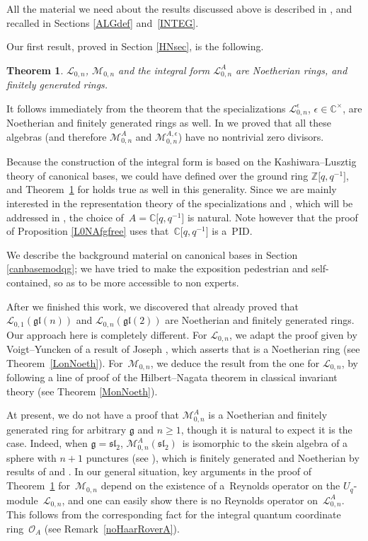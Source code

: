 \documentclass[10pt,a4paper]{amsart}
\numberwithin{equation}{section}
\newtheorem{teo}{Theorem}[section]
\theoremstyle{definition}
\newcommand{\e}{\epsilon}
\newcommand{\mc}{\mathbb{C}}
\newcommand{\Ll}{{\mathcal L}}
\newcommand{\Mm}{{\mathcal M}}
\newcommand{\Oo}{{\mathcal O}}
\begin{document}
All the material we need about the results discussed above is described in \cite{BR}, and recalled in Sections \ref{ALGdef} and~\ref{INTEG}.

Our first result, proved in Section \ref{HNsec}, is the following.

\begin{teo}\label{HN} $\Ll_{0,n}$, $\Mm_{0,n}$ and the integral form $\Ll_{0,n}^A$ are Noetherian rings, and finitely generated rings.
\end{teo}
It follows immediately from the theorem that the specializations $\Ll_{0,n}^\e$, $\e \in \mc^\times$, are Noetherian and finitely generated rings as well. In \cite{BR} we proved that all these algebras (and therefore $\Mm_{0,n}^A$ and $\Mm_{0,n}^{A,\e}$) have no nontrivial zero divisors.

Because the construction of the integral form \smash{$\Ll_{0,n}^A$} is based on the Kashiwara--Lusztig theory of canonical bases, we could have defined \smash{$\Ll_{0,n}^A$} over the ground ring $\mathbb{Z}\big[q,q^{-1}\big]$, and Theorem~\ref{HN} for \smash{$\Ll_{0,n}^A$} holds true as well in this generality. Since we are mainly interested in the representation theory of the specializations \smash{$\Ll_{0,n}^\e$} and \smash{$\Mm_{0,n}^{A,\e}$}, which will be addressed in \cite{BFR2}, the choice of~${A=\mc\big[q,q^{-1}\big]}$ is natural. Note however that the proof of Proposition \ref{L0NAfgfree} uses that~${\mc\big[q,q^{-1}\big]}$ is a~PID.

We describe the background material on canonical bases in Section \ref{canbasemodqg}; we have tried to make the exposition pedestrian and self-contained, so as to be more accessible to non experts.

After we finished this work, we discovered that \cite{DomLen} already proved that $\Ll_{0,1}(\mathfrak{gl}(n))$ and $\Ll_{0,n}(\mathfrak{gl}(2))$ are Noetherian and finitely generated rings. Our approach here is completely different. For $\Ll_{0,n}$, we adapt the proof given by Voigt--Yuncken \cite{VY} of a result of Joseph \cite{Jos}, which asserts that  is a Noetherian ring (see Theorem~\ref{LonNoeth}). For~$\Mm_{0,n}$, we deduce the result from the one for $\Ll_{0,n}$, by following a line of proof of the Hilbert--Nagata theorem in classical invariant theory (see Theorem \ref{MonNoeth}).

At present, we do not have a proof that $\Mm_{0,n}^A$ is a Noetherian and finitely generated ring for arbitrary $\mathfrak{g}$ and $n\geq 1$, though it is natural to expect it is the case. Indeed, when ${\mathfrak{g}= {\mathfrak{sl}_2}}$, $\Mm_{0,n}^A({\mathfrak{sl}_2})$~is isomorphic to the skein algebra of a sphere with $n+1$ punctures (see \cite[Theorem~8.6]{BR}), which is finitely generated and Noetherian by results of \cite{Bul} and \cite{PS}. In our general situation, key arguments in the proof of Theorem~\ref{HN} for~$\Mm_{0,n}$ depend on the existence of a~Reynolds operator on the $U_q$-module~$\Ll_{0,n}$, and one can easily show there is no Reynolds operator on~$\Ll_{0,n}^A$. This follows from the corresponding fact for the integral quantum coordinate ring~$\Oo_A$ (see Remark~\ref{noHaarRoverA}).
\end{document}
